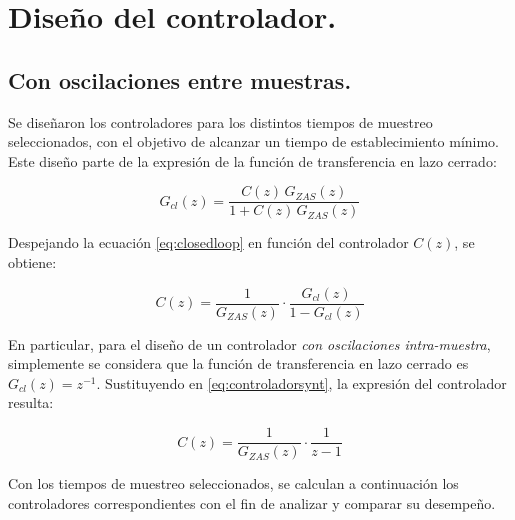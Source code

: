 \onecolumn
\section{Diseño del controlador.}

\subsection{Con oscilaciones entre muestras.}

Se diseñaron los controladores para los distintos tiempos de muestreo seleccionados, con el objetivo de alcanzar un tiempo de establecimiento mínimo. Este diseño parte de la expresión de la función de transferencia en lazo cerrado:

\begin{equation}
	G_{cl}(z) = \frac{C(z) \, G_{ZAS}(z)}{1 + C(z) \, G_{ZAS}(z)}
	\label{eq:closedloop}
\end{equation}

Despejando la ecuación \eqref{eq:closedloop} en función del controlador $C(z)$, se obtiene:

\begin{equation}
	C(z) = \frac{1}{G_{ZAS}(z)} \cdot \frac{G_{cl}(z)}{1 - G_{cl}(z)}
	\label{eq:controladorsynt}
\end{equation}

En particular, para el diseño de un controlador \emph{con oscilaciones intra-muestra}, simplemente se considera que la función de transferencia en lazo cerrado es $G_{cl}(z) = z^{-1}$. Sustituyendo en \eqref{eq:controladorsynt}, la expresión del controlador resulta:

\begin{equation}
	C(z) = \frac{1}{G_{ZAS}(z)} \cdot \frac{1}{z - 1}
	\label{eq:control1}
\end{equation}

Con los tiempos de muestreo seleccionados, se calculan a continuación los controladores correspondientes con el fin de analizar y comparar su desempeño.






